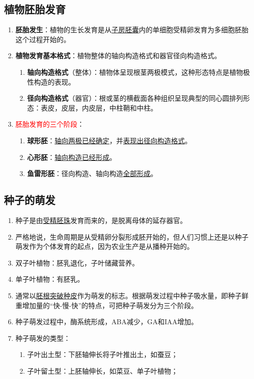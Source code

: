 \subsection{植物胚胎发育}
\begin{enumerate}
    \item \textbf{胚胎发生}：植物的生长发育是从\uline{子房胚囊}内的单细胞受精卵发育为多细胞胚胎这个过程开始的。
    \item \textbf{植物发育基本格式}：植物整体的轴向构造格式和器官径向构造格式。
    \begin{enumerate}
        \item \textbf{轴向构造格式}（整体）：植物体呈现根茎两极模式，这种形态特点是植物极性构造的表现。
        \item \textbf{径向构造格式}（器官）：根或茎的横截面各种组织呈现典型的同心圆排列形态：表皮，皮层，内皮层，中柱鞘和中柱。
    \end{enumerate}
    \item \textcolor{red}{胚胎发育的三个阶段}：
    \begin{enumerate}
        \item \textbf{球形胚}：\uline{轴向两极已经确定}，并\uline{表现出径向构造格式}。
        \item \textbf{心形胚}：\uline{轴向构造已经形成}。
        \item \textbf{鱼雷形胚}：径向构造、轴向构造\uline{全部形成}。
    \end{enumerate}
\end{enumerate}
\subsection{种子的萌发}
\begin{enumerate}
    \item 种子是由\uline{受精胚珠}发育而来的，是脱离母体的延存器官。
    \item 严格地说，生命周期是从受精卵分裂形成胚开始的，但人们习惯上还是以种子萌发作为个体发育的起点，因为农业生产是从播种开始的。
    \item 双子叶植物：胚乳退化，子叶储藏营养。
    \item 单子叶植物：有胚乳。
    \item 通常以\uline{胚根突破种皮}作为萌发的标志。根据萌发过程中种子吸水量，即种子鲜重增加量的“快-慢-快”的特点，可把种子萌发分为三个阶段。
    \item 种子萌发过程中，酶系统形成，ABA减少，GA和IAA增加。
    \item 种子萌发的类型：
    \begin{enumerate}
        \item 子叶出土型：下胚轴伸长将子叶推出土，如蚕豆；
        \item 子叶留土型：上胚轴伸长，如菜豆、单子叶植物；
    \end{enumerate}
\end{enumerate}
